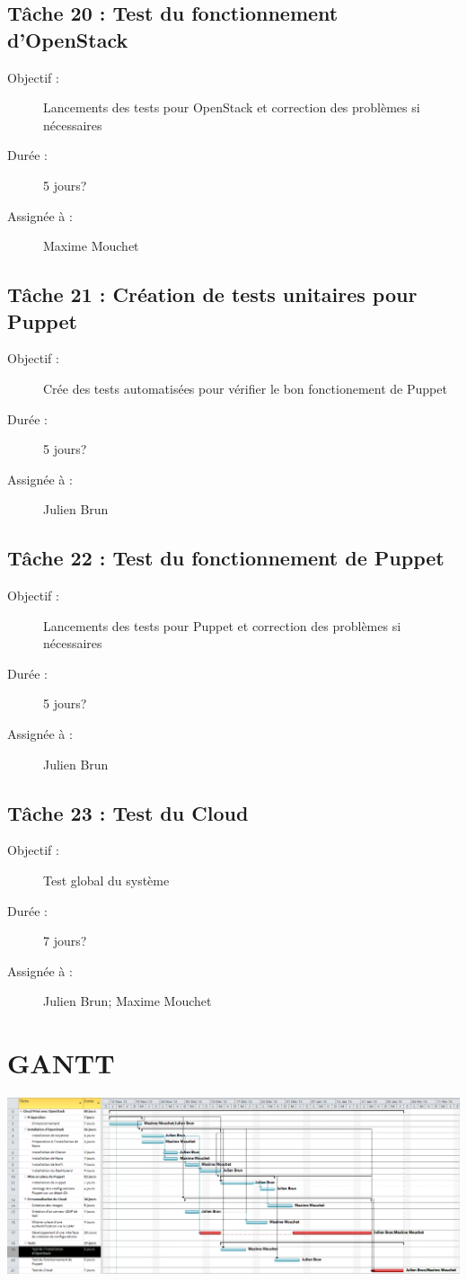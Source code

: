 \documentclass{report}
\begin{document}
\subsection*{Tâche 20 : Test du fonctionnement d'OpenStack}
\begin{description}
\item[Objectif :] Lancements des tests pour OpenStack et correction des problèmes si nécessaires
\item[Durée :]  5 jours?
\item[Assignée à :] Maxime Mouchet
\end{description}

\subsection*{Tâche 21 : Création de tests unitaires pour Puppet}
\begin{description}
\item[Objectif :] Crée des tests automatisées pour vérifier le bon fonctionement de Puppet
\item[Durée :]  5 jours?
\item[Assignée à :] Julien Brun
\end{description}

\subsection*{Tâche 22 : Test du fonctionnement de Puppet}
\begin{description}
\item[Objectif :] Lancements des tests pour Puppet et correction des problèmes si nécessaires
\item[Durée :] 5 jours?
\item[Assignée à :] Julien Brun
\end{description}

\subsection*{Tâche 23 : Test du Cloud}
\begin{description}
\item[Objectif :] Test global du système
\item[Durée :] 7 jours?
\item[Assignée à :] Julien Brun; Maxime Mouchet
\end{description}

\section{GANTT}
\includegraphics[width=25cm,angle=90]{images/gantt.png}
\end{document}
